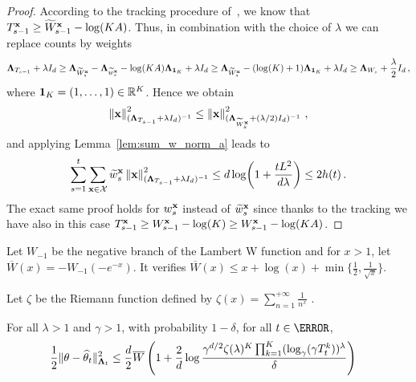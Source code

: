 \begin{proof}
According to the tracking procedure of~\cite{degenne2020structure}, we know that $T_{s-1}^{{\bf x}} \geq \widetilde{W}_{s-1}^{{\bf x}} -\log(KA)$. Thus, in combination with the choice of $\lambda$  we can replace counts by weights
\begin{align*}
  {\boldsymbol \Lambda}_{T_{s-1}} + \lambda I_d \geq {\boldsymbol \Lambda}_{\widetilde{W}^{{\bf x}}_{s}} - {\boldsymbol \Lambda}_{\widetilde{w}_s^{{\bf x}}} - \log(KA) {\boldsymbol \Lambda}_{{\bf 1}_K} +\lambda I_d \geq  {\boldsymbol \Lambda}_{\widetilde{W}^{{\bf x}}_{s}} - (\log(K)+1) {\boldsymbol \Lambda}_{{\bf 1}_K} +\lambda I_d \geq {\boldsymbol \Lambda}_{W_{s}}+ \frac{\lambda}{2} I_d\,,
\end{align*}
where ${\bf 1}_K = (1,\ldots,1)\in\mathbb{R}^K$.
Hence we obtain
\[
\left\lVert{\bf x}\right\rVert_{({\boldsymbol \Lambda}_{T_{s-1}}+\lambda I_d)^{-1}}^2 \leq \left\lVert{\bf x}\right\rVert_{({\boldsymbol \Lambda}_{\widetilde{W}^{{\bf x}}_{s}}+(\lambda/2) I_d)^{-1}}^2\,,
\]
and applying Lemma~\ref{lem:sum_w_norm_a} leads to
\[
\sum_{s=1}^t \sum_{{\bf x}\in\mathcal{X}} \widetilde{w}_s^{{\bf x}} \left\lVert{\bf x}\right\rVert_{({\boldsymbol \Lambda}_{T_{s-1}}+\lambda I_d)^{-1}}^2 \leq d \log\!\left(1 +\frac{t L^2}{d \lambda} \right)\leq 2h(t)\,.
\]
The exact same proof holds for $w^{{\bf x}}_s$ instead of $\widetilde{w}_s^{{\bf x}}$ since thanks to the tracking we have also in this case $T_{s-1}^{{\bf x}} \geq W_{s-1}^{{\bf x}} -\log(K) \geq W_{s-1}^{{\bf x}} -\log(KA)$.

\end{proof}



\iffalse
Let $W_{-1}$ be the negative branch of the Lambert W function and for $x>1$, let $\overline{W}(x) = -W_{-1}(-e^{-x})$. It verifies $\overline{W}(x) \le x + \log(x) + \min\{\frac{1}{2}, \frac{1}{\sqrt{x}}\}$.

Let $\zeta$ be the Riemann function defined by $\zeta(x) = \sum_{n=1}^{+\infty}\frac{1}{n^x}$ .

\begin{theorem}\label{thm:maximal_concentration_inequality}
For all $\lambda>1$ and $\gamma>1$, with probability $1-\delta$, for all $t\in \N$,
\begin{align*}
\frac{1}{2} \Vert \theta - \widehat{\theta}_t \Vert_{{\boldsymbol \Lambda}_t}^2
&\le \frac{d}{2} \overline{W}\left( 1 + \frac{2}{d}\log \frac{\gamma^{d/2}\zeta(\lambda)^K\prod_{k=1}^K(\log_\gamma(\gamma T_t^k))^\lambda}{\delta} \right)
\end{align*}
\end{theorem}


